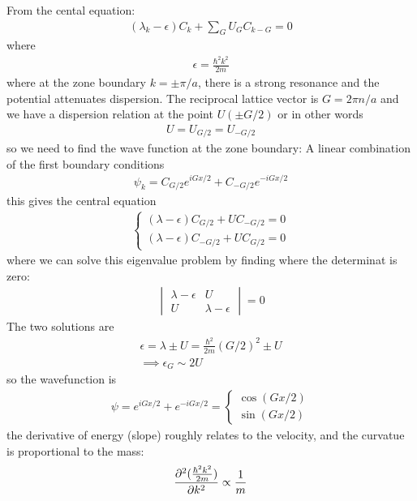 \documentclass[../main.tex]{subfiles}
\begin{document}
\newpage
{}
From the cental equation:
\begin{align*}
    (\lambda_k - \epsilon) C_k + \sum_G U_G C_{k-G} = 0
\end{align*}
where
\begin{align*}
    \epsilon = \frac{\hbar^2 k^2}{2m}
\end{align*}
where at the zone boundary $k = \pm \pi/a$, there is a strong resonance and the potential attenuates
dispersion. The reciprocal lattice vector is $G = 2\pi n/a$ and we have a dispersion relation at the
point $U(\pm G/2)$ or in other words
\begin{align*}
    U = U_{G/2} = U_{-G/2}
\end{align*} 
so we need to find the wave function at the zone boundary: A linear combination of the first 
boundary conditions
\begin{align*}
    \psi_k = C_{G/2} e^{iGx/2} + C_{-G/2} e^{-iGx/2}
\end{align*}
this gives the central equation
\begin{align*}
    \begin{cases}
        (\lambda - \epsilon)C_{G/2} + U C_{-G/2} = 0 \\
        (\lambda - \epsilon)C_{-G/2} + U C_{G/2} = 0
    \end{cases}
\end{align*}
where we can solve this eigenvalue problem by finding where the determinat is zero:
\begin{align*}
    \begin{vmatrix}
        \lambda - \epsilon & U \\
        U & \lambda - \epsilon
    \end{vmatrix} = 0
\end{align*}
The two solutions are
\begin{align*}
    \epsilon = \lambda \pm U = \frac{\hbar^2}{2m} (G/2)^2 \pm U \\
    \implies \epsilon_G \sim 2U
\end{align*}
so the wavefunction is
\begin{align*}
    \psi = e^{iGx/2} + e^{-iGx/2} = \begin{cases}
        \cos(Gx/2) \\
        \sin(Gx/2)
    \end{cases}
\end{align*}
the derivative of energy (slope) roughly relates to the velocity, and the curvatue
is proportional to the mass:
\begin{align*}
    \pdv[2]{(\frac{\hbar^2 k^2}{2m})}{k} \propto \frac{1}{m}
\end{align*}
\end{document}
